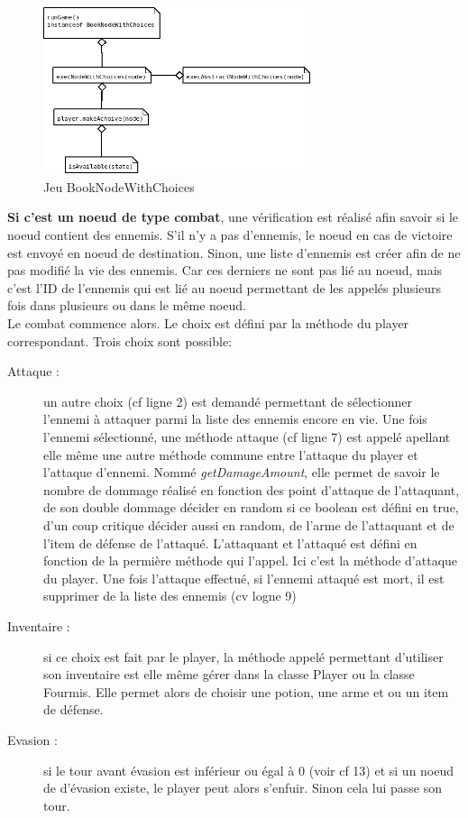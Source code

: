		\begin{figure}[H]
			\centering\includegraphics[width=0.70\textwidth]{img/JeuBookNodeWithChoices.png}
			\caption{Jeu BookNodeWithChoices}
			\label{fig:JeuBookNodeWithChoices}
		\end{figure}


		\textbf{Si c'est un noeud de type combat}, une vérification est réalisé afin savoir si le noeud contient des ennemis. S'il n'y a pas d'ennemis, le noeud en cas de victoire est envoyé en noeud de destination. Sinon, une liste d'ennemis est créer afin de ne pas modifié la vie des ennemis. Car ces derniers ne sont pas lié au noeud, mais c'est l'ID de l'ennemis qui est lié au noeud permettant de les appelés plusieurs fois dans plusieurs ou dans le même noeud.\\
		Le combat commence alors. Le choix est défini par la méthode du player correspondant. Trois choix sont possible:

		\begin{description}
			\item[Attaque :]{un autre choix (cf ligne 2) est demandé permettant de sélectionner l'ennemi à attaquer parmi la liste des ennemis encore en vie. Une fois l'ennemi sélectionné, une méthode attaque (cf ligne 7) est appelé apellant elle même une autre méthode commune entre l'attaque du player et l'attaque d'ennemi. Nommé \textit{getDamageAmount}, elle permet de savoir le nombre de dommage réalisé en fonction des point d'attaque de l'attaquant, de son double dommage décider en random si ce boolean est défini en true, d'un coup critique décider aussi en random, de l'arme de l'attaquant et de l'item de défense de l'attaqué. L'attaquant et l'attaqué est défini en fonction de la permière méthode qui l'appel. Ici c'est la méthode d'attaque du player.}
			Une fois l'attaque effectué, si l'ennemi attaqué est mort, il est supprimer de la liste des ennemis (cv logne 9)
			\item[Inventaire :]{si ce choix est fait par le player, la méthode appelé permettant d'utiliser son inventaire est elle même gérer dans la classe Player ou la classe Fourmis. Elle permet alors de choisir une potion, une arme et ou un item de défense.}
			\item[Evasion :]{si le tour avant évasion est inférieur ou égal à 0 (voir cf 13) et si un noeud de d'évasion existe, le player peut alors s'enfuir. Sinon cela lui passe son tour.}
		\end{description}

